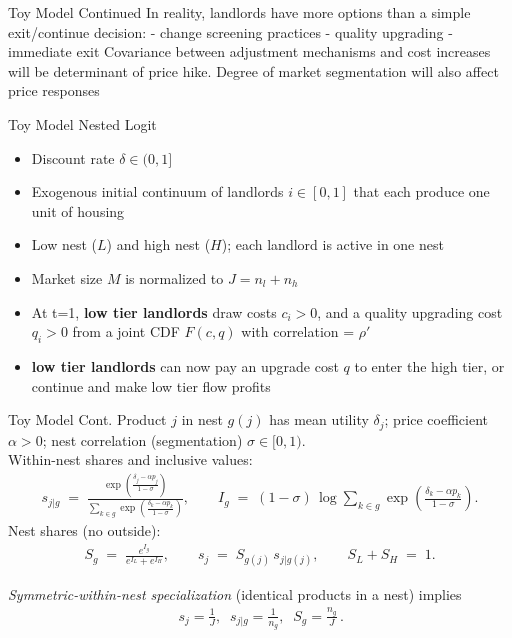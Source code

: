 \documentclass[10pt, xcolor=dvipsnames]{beamer}
\begin{document}
\begin{frame}{Toy Model Continued}
    In reality, landlords have more options than a simple exit/continue decision:
    - change screening practices
    - quality upgrading
    - immediate exit
    Covariance between adjustment mechanisms and cost increases will be determinant of price hike. Degree of market segmentation will also affect price responses
\end{frame}

\begin{frame}{Toy Model Nested Logit}
    \begin{itemize}
        \item Discount rate $\delta \in (0,1]$
        \item Exogenous initial continuum of landlords $i \in [0,1]$ that each produce one unit of housing
        \item Low nest ($L$) and high nest ($H$); each landlord is active in one nest
        \item Market size $M$ is normalized to $J=n_l +n_h$
        \item At t=1, \textbf{low tier landlords} draw costs $c_i>0$, and a quality upgrading cost $q_i>0$ from a joint CDF $F(c,q)$ with correlation = $\rho'$
        \item \textbf{low tier landlords} can now pay an upgrade cost $q$ to enter the high tier, or continue and make low tier flow profits
    \end{itemize}    
\end{frame}

\begin{frame}{Toy Model Cont.}
    Product $j$ in nest $g(j)$ has mean utility $\delta_j$; price coefficient $\alpha>0$; nest correlation (segmentation) $\sigma\in[0,1)$. \\
    
    Within-nest shares and inclusive values:
        \begin{align*}
            s_{j|g} \;=\;
            \frac{\exp\!\left(\frac{\delta_j-\alpha p_j}{1-\sigma}\right)}
            {\sum_{k\in g}\exp\!\left(\frac{\delta_k-\alpha p_k}{1-\sigma}\right)},
            \qquad
            I_g \;=\; (1-\sigma)\,\log\!\sum_{k\in g}\exp\!\left(\frac{\delta_k-\alpha p_k}{1-\sigma}\right).
        \end{align*}
    Nest shares (no outside):
        \begin{align*}
            S_g \;=\;\frac{e^{I_g}}{e^{I_L}+e^{I_H}},
            \qquad
            s_j \;=\; S_{g(j)}\,s_{j|g(j)},
            \qquad
            S_L+S_H \;=\; 1.
        \end{align*}
    
    \emph{Symmetric-within-nest specialization} (identical products in a nest) implies
        \begin{align*}
            \boxed{\,s_j=\tfrac{1}{J},\;\; s_{j|g}=\tfrac{1}{n_g},\;\; S_g=\tfrac{n_g}{J}\,}.
        \end{align*}
    
\end{frame}
\end{document}
